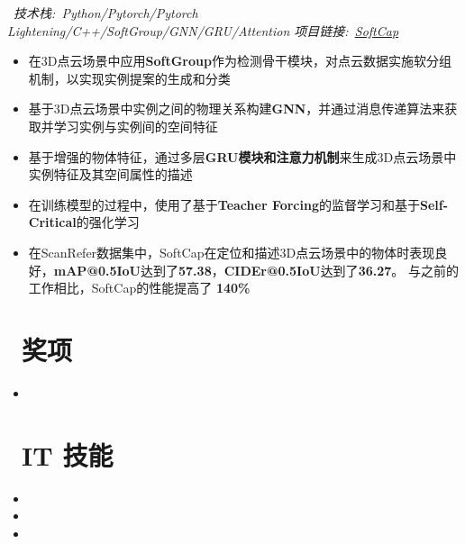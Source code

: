 \documentclass{resume}
\begin{document}
\ \textit{技术栈:\ Python/Pytorch/Pytorch Lightening/C++/SoftGroup/GNN/GRU/Attention \hfill 项目链接:\ \href{https://github.com/LuckyMax0722/SoftCap}{SoftCap}}
\begin{itemize}
  \item 在3D点云场景中应用\textbf{SoftGroup}作为检测骨干模块，对点云数据实施软分组机制，以实现实例提案的生成和分类
  \item 基于3D点云场景中实例之间的物理关系构建\textbf{GNN}，并通过消息传递算法来获取并学习实例与实例间的空间特征
  \item 基于增强的物体特征，通过多层\textbf{GRU模块和注意力机制}来生成3D点云场景中实例特征及其空间属性的描述
  \item 在训练模型的过程中，使用了基于\textbf{Teacher Forcing}的监督学习和基于\textbf{Self-Critical}的强化学习
  \item 在ScanRefer数据集中，SoftCap在定位和描述3D点云场景中的物体时表现良好，\textbf{mAP@0.5IoU}达到了\textbf{57.38}，\textbf{CIDEr@0.5IoU}达到了\textbf{36.27}。 与之前的工作相比，SoftCap的性能提高了 \textbf{140\%}
\end{itemize}
\vspace{0.4cm}

\section{\faStar\ 奖项}

\begin{itemize}
  \item {}
\end{itemize}
\vspace{0.4cm}

\section{\faCogs\ IT 技能}
\begin{itemize}
  \item {}

  \vspace{0.1cm}

  \item {}

  \vspace{0.1cm}

  \item {}

\end{itemize}
\vspace{0.4cm}
\end{document}
